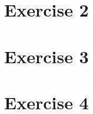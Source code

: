 \documentclass[a4paper,german]{article}
\begin{document}
\section*{Exercise 2}
\section*{Exercise 3}
\section*{Exercise 4}
\end{document}
